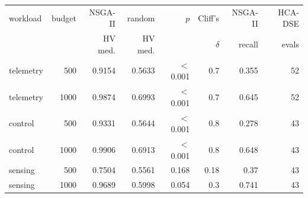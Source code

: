 \scriptsize
\begin{tabular}{lrrrrrrr}
\toprule
workload & budget & NSGA-II & random & $p$ & Cliff's & NSGA-II & HCA-DSE \\
 & & HV med. & HV med. & & $\delta$ & recall & evals \\
\midrule
telemetry & 500 & 0.9154 & 0.5633 & $<$0.001 & 0.7 & 0.355 & 52 \\
telemetry & 1000 & 0.9874 & 0.6993 & $<$0.001 & 0.7 & 0.645 & 52 \\
control & 500 & 0.9331 & 0.5644 & $<$0.001 & 0.8 & 0.278 & 43 \\
control & 1000 & 0.9906 & 0.6913 & $<$0.001 & 0.8 & 0.648 & 43 \\
sensing & 500 & 0.7504 & 0.5561 & 0.168 & 0.18 & 0.37 & 43 \\
sensing & 1000 & 0.9689 & 0.5998 & 0.054 & 0.3 & 0.741 & 43 \\
\bottomrule
\end{tabular}
